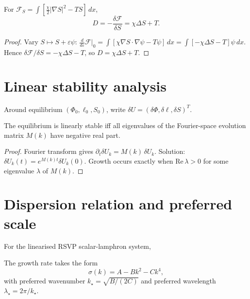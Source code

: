 \begin{proposition}
  \label{prop:lamphrodyne-entropy}
  \statusproven{}
  For $\mathcal{F}_S = \int[\frac{\chi}{2}|\nabla S|^2 - TS]\,dx$,
  \[
    D = -\frac{\delta\mathcal{F}}{\delta S} = \chi\Delta S + T.
  \]
\end{proposition}

\begin{proof}
  Vary $S \mapsto S + \varepsilon\psi$:
  $\frac{d}{d\varepsilon}\mathcal{F}\big|_0
  = \int[\chi\nabla S\cdot\nabla\psi - T\psi]\,dx
  = \int[-\chi\Delta S - T]\psi\,dx$.
  Hence $\delta\mathcal{F}/\delta S = -\chi\Delta S - T$,
  so $D = \chi\Delta S + T$.
\end{proof}

\section{Linear stability analysis}

\begin{definition}
  Around equilibrium $(\Phi_0, \ell_0, S_0)$, write
  $\delta U = (\delta\Phi, \delta\ell, \delta S)^T$.
\end{definition}

\begin{theorem}
  \label{thm:spectral-stability}
  \statusproven{}
  The equilibrium is linearly stable iff all eigenvalues of
  the Fourier-space evolution matrix $M(k)$ have negative
  real part.
\end{theorem}

\begin{proof}
  Fourier transform gives $\partial_t\delta U_k = M(k)\,\delta U_k$.
  Solution: $\delta U_k(t) = e^{M(k)t}\delta U_k(0)$.
  Growth occurs exactly when $\mathrm{Re}\,\lambda > 0$ for
  some eigenvalue $\lambda$ of $M(k)$.
\end{proof}

\section{Dispersion relation and preferred scale}

For the linearised RSVP scalar-lamphron system,

\begin{proposition}
  \label{prop:dispersion}
  \statusproven{}
  The growth rate takes the form
  \[
    \sigma(k) = A - Bk^2 - Ck^4,
  \]
  with preferred wavenumber $k_\star = \sqrt{B/(2C)}$
  and preferred wavelength $\lambda_\star = 2\pi/k_\star$.
\end{proposition}

